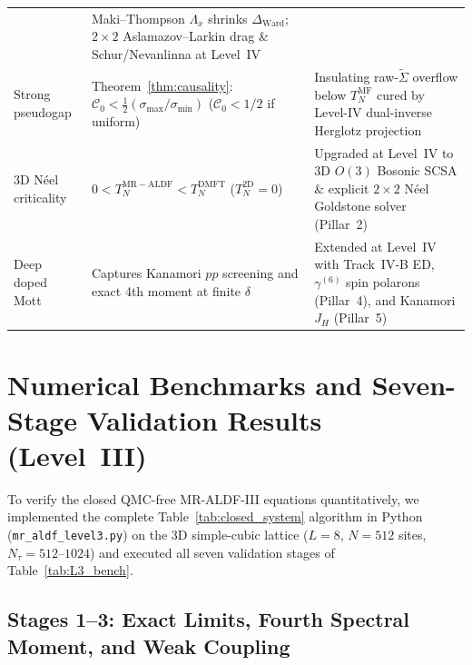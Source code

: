 \documentclass[11pt,a4paper]{article}
\numberwithin{equation}{section}
\theoremstyle{plain}
\theoremstyle{definition}
\begin{document}
\begin{table}[htbp]
\begin{tabular}{p{3.2cm}p{5.3cm}p{5.8cm}}
    & Maki--Thompson $\Lambda_x$ shrinks $\Delta_{\mathrm{Ward}}$; $2\times 2$ Aslamazov--Larkin drag \& Schur/Nevanlinna at Level~IV \\
Strong pseudogap
    & Theorem~\ref{thm:causality}: $\mathcal{C}_0 < \frac{1}{2}(\sigma_{\max}/\sigma_{\min})$ ($\mathcal{C}_0 < 1/2$ if uniform)
    & Insulating raw-$\tilde{\Sigma}$ overflow below $T_N^{\mathrm{MF}}$ cured by Level-IV dual-inverse Herglotz projection \\
3D N\'eel criticality
    & $0 < T_N^{\mathrm{MR-ALDF}} < T_N^{\mathrm{DMFT}}$ ($T_N^{\mathrm{2D}} = 0$)
    & Upgraded at Level~IV to 3D $O(3)$ Bosonic SCSA \& explicit $2\times 2$ N\'eel Goldstone solver (Pillar~2) \\
Deep doped Mott
    & Captures Kanamori $pp$ screening and exact 4th moment at finite $\delta$
    & Extended at Level~IV with Track~IV-B ED, $\gamma^{(6)}$ spin polarons (Pillar~4), and Kanamori $J_H$ (Pillar~5) \\
\hline\hline
\end{tabular}
\end{table}

\section{Numerical Benchmarks and Seven-Stage Validation Results (Level~III)}
\label{sec:benchmarks_live}

To verify the closed QMC-free MR-ALDF-III equations quantitatively, we implemented the
complete Table~\ref{tab:closed_system} algorithm in Python (\texttt{mr\_aldf\_level3.py})
on the 3D simple-cubic lattice ($L = 8$, $N = 512$ sites, $N_\tau = 512$--$1024$) and
executed all seven validation stages of Table~\ref{tab:L3_bench}.

\subsection{Stages 1--3: Exact Limits, Fourth Spectral Moment, and Weak Coupling}
\label{sec:bench_123}
\end{document}

